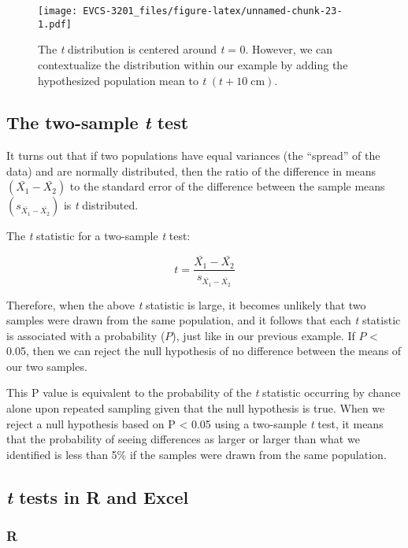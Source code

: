 \documentclass[]{book}
\begin{document}
\begin{figure}
\centering
\texttt{[image: EVCS-3201\_files/figure-latex/unnamed-chunk-23-1.pdf]}
\caption{\label{fig:unnamed-chunk-23}The \emph{t} distribution is centered
around \emph{t} = 0. However, we can contextualize the distribution
within our example by adding the hypothesized population mean to
\emph{t} \((t + 10\;\textrm{cm})\).}
\end{figure}

\subsection{\texorpdfstring{The two-sample \emph{t}
test}{The two-sample t test}}\label{the-two-sample-t-test}

It turns out that if two populations have equal variances (the
``spread'' of the data) and are normally distributed, then the ratio of
the difference in means \((\bar{X_1} - \bar{X_2})\) to the standard
error of the difference between the sample means
\((s_{\bar{X_1} - \bar{X_2}})\) is \emph{t} distributed.

The \emph{t} statistic for a two-sample \emph{t} test:

\[t = \frac{\bar{X_1} - \bar{X_2}}{s_{\bar{X_1} - \bar{X_2}}}\]

Therefore, when the above \emph{t} statistic is large, it becomes
unlikely that two samples were drawn from the same population, and it
follows that each \emph{t} statistic is associated with a probability
(\(P\)), just like in our previous example. If \(P\) \textless{} 0.05,
then we can reject the null hypothesis of no difference between the
means of our two samples.

This P value is equivalent to the probability of the \emph{t} statistic
occurring by chance alone upon repeated sampling given that the null
hypothesis is true. When we reject a null hypothesis based on P
\textless{} 0.05 using a two-sample \emph{t} test, it means that the
probability of seeing differences as larger or larger than what we
identified is less than 5\% if the samples were drawn from the same
population.

\subsection{\texorpdfstring{\emph{t} tests in R and
Excel}{t tests in R and Excel}}\label{t-tests-in-r-and-excel}

\subsubsection{R}\label{r}
\end{document}
